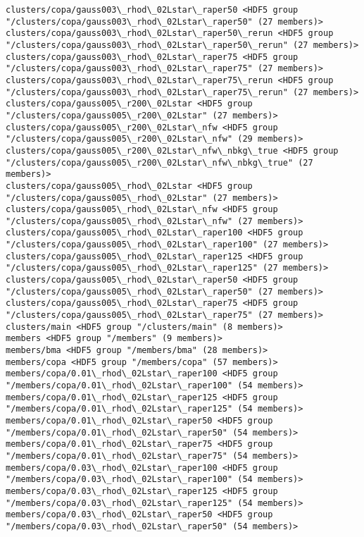 \documentclass[11pt]{article}
\begin{document}
\begin{Verbatim}[commandchars=\\\{\}]
clusters/copa/gauss003\_rhod\_02Lstar\_raper50 <HDF5 group "/clusters/copa/gauss003\_rhod\_02Lstar\_raper50" (27 members)>
clusters/copa/gauss003\_rhod\_02Lstar\_raper50\_rerun <HDF5 group "/clusters/copa/gauss003\_rhod\_02Lstar\_raper50\_rerun" (27 members)>
clusters/copa/gauss003\_rhod\_02Lstar\_raper75 <HDF5 group "/clusters/copa/gauss003\_rhod\_02Lstar\_raper75" (27 members)>
clusters/copa/gauss003\_rhod\_02Lstar\_raper75\_rerun <HDF5 group "/clusters/copa/gauss003\_rhod\_02Lstar\_raper75\_rerun" (27 members)>
clusters/copa/gauss005\_r200\_02Lstar <HDF5 group "/clusters/copa/gauss005\_r200\_02Lstar" (27 members)>
clusters/copa/gauss005\_r200\_02Lstar\_nfw <HDF5 group "/clusters/copa/gauss005\_r200\_02Lstar\_nfw" (29 members)>
clusters/copa/gauss005\_r200\_02Lstar\_nfw\_nbkg\_true <HDF5 group "/clusters/copa/gauss005\_r200\_02Lstar\_nfw\_nbkg\_true" (27 members)>
clusters/copa/gauss005\_rhod\_02Lstar <HDF5 group "/clusters/copa/gauss005\_rhod\_02Lstar" (27 members)>
clusters/copa/gauss005\_rhod\_02Lstar\_nfw <HDF5 group "/clusters/copa/gauss005\_rhod\_02Lstar\_nfw" (27 members)>
clusters/copa/gauss005\_rhod\_02Lstar\_raper100 <HDF5 group "/clusters/copa/gauss005\_rhod\_02Lstar\_raper100" (27 members)>
clusters/copa/gauss005\_rhod\_02Lstar\_raper125 <HDF5 group "/clusters/copa/gauss005\_rhod\_02Lstar\_raper125" (27 members)>
clusters/copa/gauss005\_rhod\_02Lstar\_raper50 <HDF5 group "/clusters/copa/gauss005\_rhod\_02Lstar\_raper50" (27 members)>
clusters/copa/gauss005\_rhod\_02Lstar\_raper75 <HDF5 group "/clusters/copa/gauss005\_rhod\_02Lstar\_raper75" (27 members)>
clusters/main <HDF5 group "/clusters/main" (8 members)>
members <HDF5 group "/members" (9 members)>
members/bma <HDF5 group "/members/bma" (28 members)>
members/copa <HDF5 group "/members/copa" (57 members)>
members/copa/0.01\_rhod\_02Lstar\_raper100 <HDF5 group "/members/copa/0.01\_rhod\_02Lstar\_raper100" (54 members)>
members/copa/0.01\_rhod\_02Lstar\_raper125 <HDF5 group "/members/copa/0.01\_rhod\_02Lstar\_raper125" (54 members)>
members/copa/0.01\_rhod\_02Lstar\_raper50 <HDF5 group "/members/copa/0.01\_rhod\_02Lstar\_raper50" (54 members)>
members/copa/0.01\_rhod\_02Lstar\_raper75 <HDF5 group "/members/copa/0.01\_rhod\_02Lstar\_raper75" (54 members)>
members/copa/0.03\_rhod\_02Lstar\_raper100 <HDF5 group "/members/copa/0.03\_rhod\_02Lstar\_raper100" (54 members)>
members/copa/0.03\_rhod\_02Lstar\_raper125 <HDF5 group "/members/copa/0.03\_rhod\_02Lstar\_raper125" (54 members)>
members/copa/0.03\_rhod\_02Lstar\_raper50 <HDF5 group "/members/copa/0.03\_rhod\_02Lstar\_raper50" (54 members)>

\end{Verbatim}
\end{document}

